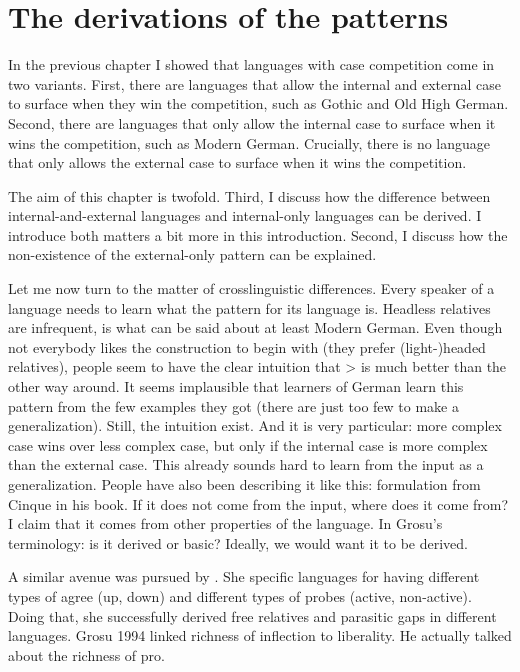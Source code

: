 
\chapter{The derivations of the patterns}\label{ch:relativization}

In the previous chapter I showed that languages with case competition come in two variants. First, there are languages that allow the internal and external case to surface when they win the competition, such as Gothic and Old High German. Second, there are languages that only allow the internal case to surface when it wins the competition, such as Modern German. Crucially, there is no language that only allows the external case to surface when it wins the competition.

The aim of this chapter is twofold. Third, I discuss how the difference between internal-and-external languages and internal-only languages can be derived. I introduce both matters a bit more in this introduction. Second, I discuss how the non-existence of the external-only pattern can be explained.

Let me now turn to the matter of crosslinguistic differences. Every speaker of a language needs to learn what the pattern for its language is. Headless relatives are infrequent, is what can be said about at least Modern German. Even though not everybody likes the construction to begin with (they prefer (light-)headed relatives), people seem to have the clear intuition that > is much better than the other way around. It seems implausible that learners of German learn this pattern from the few examples they got (there are just too few to make a generalization). Still, the intuition exist. And it is very particular: more complex case wins over less complex case, but only if the internal case is more complex than the external case. This already sounds hard to learn from the input as a generalization. People have also been describing it like this: formulation from Cinque in his book. If it does not come from the input, where does it come from? I claim that it comes from other properties of the language. In Grosu's terminology: is it derived or basic? Ideally, we would want it to be derived.

A similar avenue was pursued by \citealt{himmelreich2017}. She specific languages for having different types of agree (up, down) and different types of probes (active, non-active). Doing that, she successfully derived free relatives and parasitic gaps in different languages. Grosu 1994 linked richness of inflection to liberality. He actually talked about the richness of pro.

